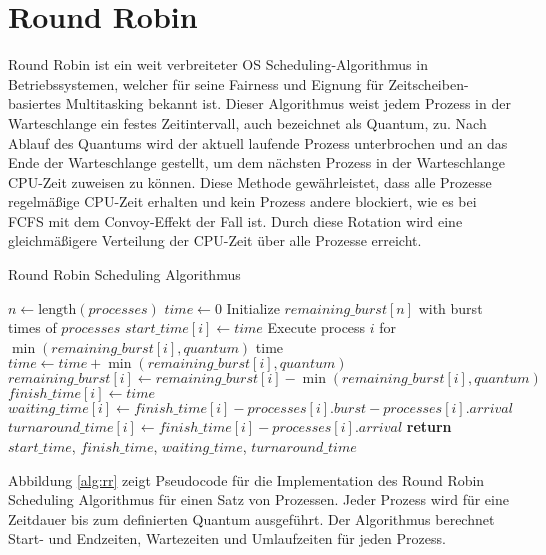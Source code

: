 \section{Round Robin}
Round Robin ist ein weit verbreiteter OS Scheduling-Algorithmus in Betriebssystemen, welcher für seine Fairness und Eignung für Zeitscheiben-basiertes Multitasking bekannt ist. Dieser Algorithmus weist jedem Prozess in der Warteschlange ein festes Zeitintervall, auch bezeichnet als Quantum, zu. Nach Ablauf des Quantums wird der aktuell laufende Prozess unterbrochen und an das Ende der Warteschlange gestellt, um dem nächsten Prozess in der Warteschlange \ac{CPU}-Zeit zuweisen zu können. Diese Methode gewährleistet, dass alle Prozesse regelmäßige \ac{CPU}-Zeit erhalten und kein Prozess andere blockiert, wie es bei \ac{FCFS} mit dem Convoy-Effekt der Fall ist. Durch diese Rotation wird eine gleichmäßigere Verteilung der \ac{CPU}-Zeit über alle Prozesse erreicht. %

\begin{algorithm}
	\caption{Round Robin Scheduling Algorithmus}
	\begin{algorithmic}[1]
		\State $n \gets \text{length}(processes)$
		\State $time \gets 0$
		\State Initialize $remaining\_burst[n]$ with burst times of $processes$
		\State $start\_time[i] \gets time$
		\State Execute process $i$ for $\min(remaining\_burst[i], quantum)$ time
		\State $time \gets time + \min(remaining\_burst[i], quantum)$
		\State $remaining\_burst[i] \gets remaining\_burst[i] - \min(remaining\_burst[i], quantum)$
		\State $finish\_time[i] \gets time$
		\State $waiting\_time[i] \gets finish\_time[i] - processes[i].burst - processes[i].arrival$
		\State $turnaround\_time[i] \gets finish\_time[i] - processes[i].arrival$
		\EndIf
		\EndIf
		\EndFor
		\EndWhile
		\State \textbf{return} $start\_time$, $finish\_time$, $waiting\_time$, $turnaround\_time$
		\EndProcedure
	\end{algorithmic}
\end{algorithm}

Abbildung \ref{alg:rr} zeigt Pseudocode für die Implementation des Round Robin Scheduling Algorithmus für einen Satz von Prozessen. Jeder Prozess wird für eine Zeitdauer bis zum definierten Quantum ausgeführt. Der Algorithmus berechnet Start- und Endzeiten, Wartezeiten und Umlaufzeiten für jeden Prozess. 

